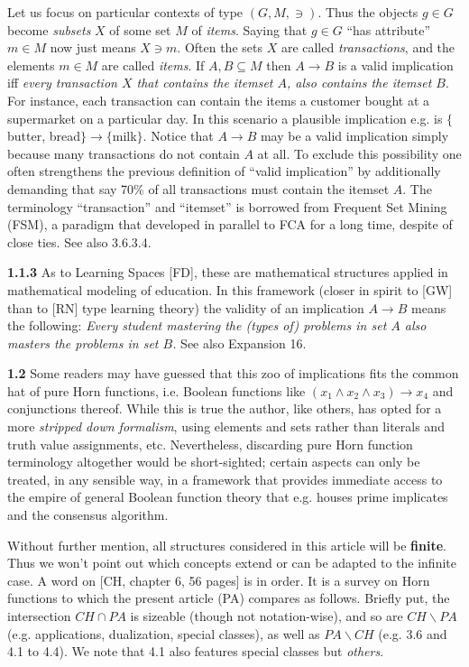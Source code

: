 \documentclass[11pt]{article}
\newcommand{\ra}{\rightarrow}
\begin{document}
Let us focus on particular contexts of type $(G, M, \ni)$. Thus the objects $g \in G$ become {\it subsets} $X$ of some set $M$ of {\it items}. Saying that $g \in G$ ``has attribute'' $m \in M$ now just means $X \ni m$. Often the sets $X$ are called {\it transactions}, and the elements $m \in M$ are called {\it items}. 
If $A, B \subseteq M$ then  $A \ra B$ is a valid implication iff {\it every transaction $X$ that contains the itemset $A$, also contains the itemset $B$}. For instance, each transaction can contain the items a customer  bought at a supermarket on a particular day. In this scenario a plausible implication e.g. is $\{$butter, bread$\} \ra \{$milk$\}$. Notice that $A \ra B$ may be a valid implication simply because many transactions do not contain $A$ at all. To exclude this possibility one often strengthens the previous definition of ``valid implication'' by additionally demanding that say 70\% of all transactions must contain the itemset $A$. The terminology ``transaction'' and ``itemset'' is borrowed from Frequent Set Mining (FSM), a paradigm that developed in parallel to FCA for a long time, despite of close ties.  See also 3.6.3.4.

{\bf 1.1.3} As to Learning Spaces [FD], these are mathematical structures applied in mathematical modeling of education. In this framework (closer in spirit to [GW] than to [RN] type learning theory) the validity of an implication $A \ra B$ means the following: {\it Every student mastering the (types of) problems in set $A$ also masters the problems in set $B$.} See also Expansion 16.



{\bf 1.2} Some readers may have guessed that this zoo of implications fits the common hat of pure Horn functions, i.e. Boolean functions like $(x_1 \wedge x_2 \wedge x_3) \ra x_4$ and conjunctions thereof. While this is true the author, like others, has opted for a more {\it stripped down formalism}, using elements and sets rather than literals and truth value assignments, etc. Nevertheless, discarding pure Horn function terminology altogether would be short-sighted; certain aspects can only be treated, in any sensible way, in a framework that provides immediate access to the empire of general Boolean function theory that e.g. houses prime implicates and the consensus algorithm.

Without further mention, all structures considered in this article will be {\bf finite}. Thus we won't point out which concepts extend or can be adapted to the infinite case. A word on [CH, chapter 6, 56 pages] is in order. It is a survey on Horn functions to which the present article (PA) compares as follows. Briefly put, the intersection $CH \cap PA$ is sizeable (though not notation-wise), and so are $CH\backslash PA$ (e.g. applications, dualization, special classes), as well as $PA \backslash CH$ (e.g. 3.6 and 4.1 to 4.4). We note that 4.1 also features special classes but {\it others}.
\end{document}
